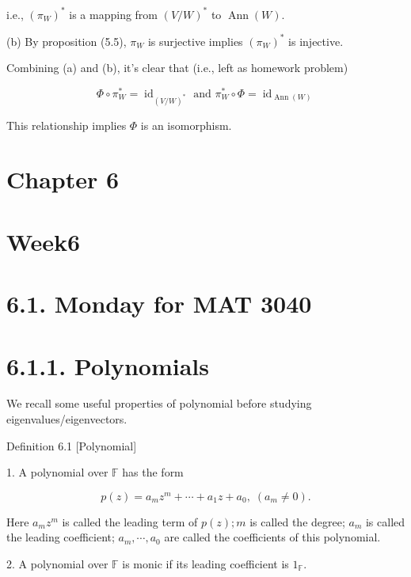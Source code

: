 \documentclass[11pt]{article}
\begin{document}
\hspace*{3em} i.e., \({\left( {\pi }_{W}\right) }^{ * }\) is a mapping from \({\left( V/W\right) }^{ * }\) to \(\operatorname{Ann}\left( W\right)\).

\hspace*{1em} (b) By proposition (5.5), \({\pi }_{W}\) is surjective implies \({\left( {\pi }_{W}\right) }^{ * }\) is injective.

Combining (a) and (b), it's clear that (i.e., left as homework problem)

\[
\Phi  \circ  {\pi }_{W}^{ * } = {\operatorname{id}}_{{\left( V/W\right) }^{ * }}\text{ and }{\pi }_{W}^{ * } \circ  \Phi  = {\operatorname{id}}_{\operatorname{Ann}\left( W\right) }
\]

This relationship implies \(\Phi\) is an isomorphism.

\HRule

\section*{Chapter 6}

\section*{Week6}

\section*{6.1. Monday for MAT 3040}

\section*{6.1.1. Polynomials}

We recall some useful properties of polynomial before studying eigenvalues/eigenvectors.

Definition 6.1 [Polynomial]

1. A polynomial over \(\mathbb{F}\) has the form

\[
p\left( z\right)  = {a}_{m}{z}^{m} + \cdots  + {a}_1z + {a}_{0},\;\left( {{a}_{m} \neq  0}\right) .
\]

Here \({a}_{m}{z}^{m}\) is called the leading term of \(p\left( z\right) ;m\) is called the degree; \({a}_{m}\) is called the leading coefficient; \({a}_{m},\cdots ,{a}_{0}\) are called the coefficients of this polynomial.

2. A polynomial over \(\mathbb{F}\) is monic if its leading coefficient is \(1_{\mathbb{F}}\).
\end{document}
